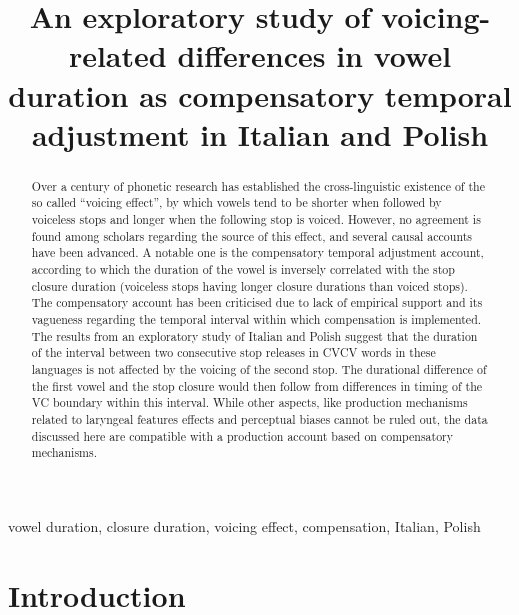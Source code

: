 \documentclass[charis]{glossa}
\title[An exploratory study of voicing-related differences in vowel duration]{An exploratory study of voicing-related differences in vowel duration as
compensatory temporal adjustment in Italian and Polish}
\author[]{
    \spauthor{Stefano Coretta\\
  \institute{The University of Manchester}\\
  \small{Oxford Road, Manchester M13 9PL stefano.coretta@manchester.ac.uk}
  }%
  }
\begin{document}
\sffamily
\maketitle


\begin{keywords}
  vowel duration, closure duration, voicing effect, compensation, Italian,
  Polish
\end{keywords}


\rmfamily

\begin{abstract}
  Over a century of phonetic research has established the cross-linguistic existence of the so called ``voicing effect'', by which vowels tend to be shorter when followed by voiceless stops and longer when the following stop is voiced.
  However, no agreement is found among scholars regarding the source of this effect, and several causal accounts have been advanced.
  A notable one is the compensatory temporal adjustment account, according to which the duration of the vowel is inversely correlated with the stop closure duration (voiceless stops having longer closure durations than voiced stops).
  The compensatory account has been criticised due to lack of empirical support and its vagueness regarding the temporal interval within which compensation is implemented.
  The results from an exploratory study of Italian and Polish suggest that the duration of the interval between two consecutive stop releases in CVCV words in these languages is not affected by the voicing of the second stop.
  The durational difference of the first vowel and the stop closure would then follow from differences in timing of the VC boundary within this interval.
  While other aspects, like production mechanisms related to laryngeal features effects and perceptual biases cannot be ruled out, the data discussed here are compatible with a production account based on compensatory mechanisms.
\end{abstract}

\hypertarget{introduction}{%
\section{Introduction}\label{introduction}}

\label{s:intro}
\end{document}
